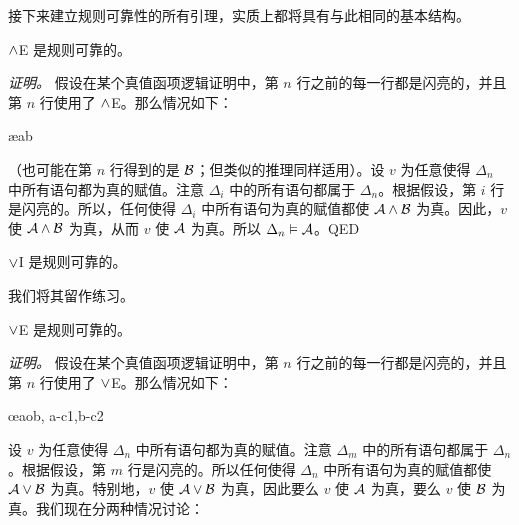 接下来建立规则可靠性的所有引理，实质上都将具有与此相同的基本结构。

\begin{factoidboxe}
$\wedge$E 是规则可靠的。
\end{factoidboxe}

\emph{证明。}
	假设在某个真值函项逻辑证明中，第 $n$ 行之前的每一行都是闪亮的，并且第 $n$ 行使用了 $\wedge$E。那么情况如下：

\begin{fitchproof}
			    \ae{ab}
		   \end{fitchproof}

\noindent
（也可能在第 $n$ 行得到的是 $\mathcal{B}$；但类似的推理同样适用）。设 $v$ 为任意使得 $\Delta_{n}$ 中所有语句都为真的赋值。注意 $\Delta_i$ 中的所有语句都属于 $\Delta_{n}$。根据假设，第 $i$ 行是闪亮的。所以，任何使得 $\Delta_i$ 中所有语句为真的赋值都使 $\mathcal{A}\wedge\mathcal{B}$ 为真。因此，$v$ 使 $\mathcal{A}\wedge\mathcal{B}$ 为真，从而 $v$ 使 $\mathcal{A}$ 为真。所以 $\Delta_{n} \vDash \mathcal{A}$。\textsc{QED}

\begin{factoidboxe}
$\vee$I 是规则可靠的。
\end{factoidboxe}

我们将其留作练习。

\begin{factoidboxe}
$\vee$E 是规则可靠的。
\end{factoidboxe}

\emph{证明。}
	假设在某个真值函项逻辑证明中，第 $n$ 行之前的每一行都是闪亮的，并且第 $n$ 行使用了 $\vee$E。那么情况如下：

\begin{fitchproof}
	   \open
		   \AS %
	   \close
	   \open
		   \AS %
	   \close
	   \oe{aob, a-c1,b-c2}
   \end{fitchproof}

\noindent
设 $v$ 为任意使得 $\Delta_{n}$ 中所有语句都为真的赋值。注意 $\Delta_m$ 中的所有语句都属于 $\Delta_{n}$。根据假设，第 $m$ 行是闪亮的。所以任何使得 $\Delta_{n}$ 中所有语句为真的赋值都使 $\mathcal{A} \vee \mathcal{B}$ 为真。特别地，$v$ 使 $\mathcal{A} \vee \mathcal{B}$ 为真，因此要么 $v$ 使 $\mathcal{A}$ 为真，要么 $v$ 使 $\mathcal{B}$ 为真。我们现在分两种情况讨论：

